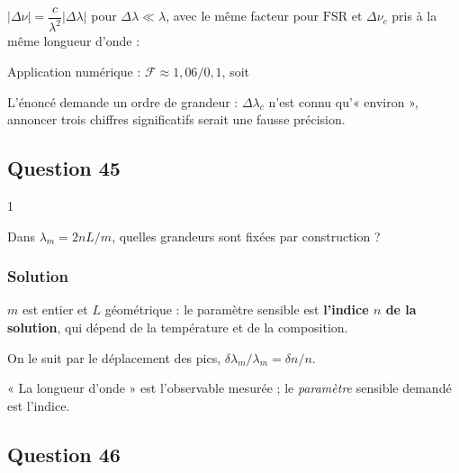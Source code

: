 \documentclass[11pt,a4paper]{article}
\newcommand{\equationajustee}[1]{%
  \sbox{\boiteequation}{$\displaystyle #1$}%
  \ifdim\wd\boiteequation>\linewidth
    \[\resizebox{\linewidth}{!}{\usebox{\boiteequation}}\]%
  \else
    \[#1\]%
  \fi}
\begin{document}
\(\lvert\Delta\nu\rvert=\dfrac{c}{\lambda^2}\lvert\Delta\lambda\rvert\) pour \(\Delta\lambda\ll\lambda\), avec le même facteur pour \(\mathrm{FSR}\) et \(\Delta\nu_c\) pris à la même longueur d'onde :

\equationajustee{\boxed{\mathcal F=\frac{{\mathrm{FSR}}_\lambda}{\Delta\lambda_c}}}

Application numérique : \(\mathcal F\approx1{,}06/0{,}1\), soit

\equationajustee{\boxed{\mathcal F\sim10}}

\begin{piege}

L'énoncé demande un ordre de grandeur : \(\Delta\lambda_c\) n'est connu qu'« environ », annoncer trois chiffres significatifs serait une fausse précision.

\end{piege}

\hypertarget{question-45}{%
\subsection{Question 45}\label{question-45}}

\begin{indication}{1}

Dans \(\lambda_m=2nL/m\), quelles grandeurs sont fixées par construction ?

\end{indication}

\hypertarget{solution-44}{%
\subsubsection{Solution}\label{solution-44}}

\(m\) est entier et \(L\) géométrique : le paramètre sensible est \textbf{l'indice \(n\) de la solution}, qui dépend de la température et de la composition.

On le suit par le déplacement des pics, \(\delta\lambda_m/\lambda_m=\delta n/n\).

\begin{piege}

« La longueur d'onde » est l'observable mesurée ; le \emph{paramètre} sensible demandé est l'indice.

\end{piege}

\hypertarget{question-46}{%
\subsection{Question 46}\label{question-46}}
\end{document}
